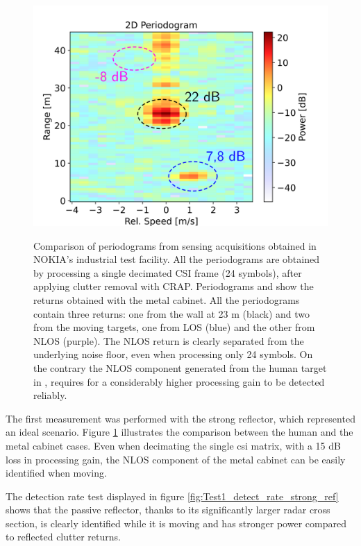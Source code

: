 \begin{figure}[H]
{		\includegraphics[scale=0.45]{Images/Test1/per_strong_ref/db_1frame_dec_CRAP_HUMAN_labelled_text22.png}
	}
	\caption[]{\small Comparison of periodograms from sensing acquisitions obtained in NOKIA's industrial test facility.
		All the periodograms are obtained by processing a single decimated CSI frame (24 symbols), after applying clutter removal with CRAP.
		Periodograms  and  show the returns obtained with the metal cabinet. All the periodograms contain three returns: one from the wall at 23 m (black) and two from the moving targets, one from LOS (blue) and the other from NLOS (purple). The NLOS return is clearly separated from the underlying noise floor, even when processing only 24 symbols. On the contrary the NLOS component generated from the human target in , requires for a considerably higher processing gain to be detected reliably.}
	\label{fig:Test1_metal-human_comparison}
	\end{figure}
	
The first measurement was performed with the strong reflector, which represented an ideal scenario. 
Figure \ref{fig:Test1_metal-human_comparison} illustrates the comparison between the human and the metal cabinet cases. 
Even when decimating the single \gls{csi} matrix, with a 15 dB loss in processing gain, the NLOS component of the metal cabinet can be easily identified when moving.

The detection rate test displayed in figure \ref{fig:Test1_detect_rate_strong_ref} shows that the passive reflector, thanks to its significantly larger radar cross section, is clearly identified while it is moving and has stronger power compared to reflected clutter returns.

